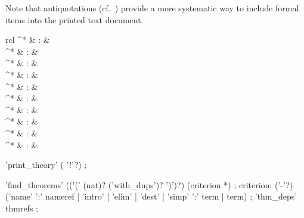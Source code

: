 \begin{isabellebody}
\begin{isamarkuptext}
  Note that antiquotations (cf.\ ) provide a more
  systematic way to include formal items into the printed text
  document.%
\end{isamarkuptext}%
\isamarkuptrue%
%
\isamarkuptrue%
%
\begin{isamarkuptext}%
\begin{matharray}{rcl}
    \mbox{}^* & : & \isarkeep{\cdot} \\
    \mbox{}^* & : &  \\
    \mbox{}^* & : &  \\
    \mbox{}^* & : &  \\
    \mbox{}^* & : &  \\
    \mbox{}^* & : &  \\
    \mbox{}^* & : &  \\
    \mbox{}^* & : &  \\
    \mbox{}^* & : &  \\
    \mbox{}^* & : &  \\
  \end{matharray}

  \begin{rail}
    'print\_theory' ( '!'?)
    ;

    'find\_theorems' (('(' (nat)? ('with\_dups')? ')')?) (criterion *)
    ;
    criterion: ('-'?) ('name' ':' nameref | 'intro' | 'elim' | 'dest' |
      'simp' ':' term | term)
    ;
    'thm\_deps' thmrefs
    ;
  \end{rail}


\end{isamarkuptext}
\end{isabellebody}
